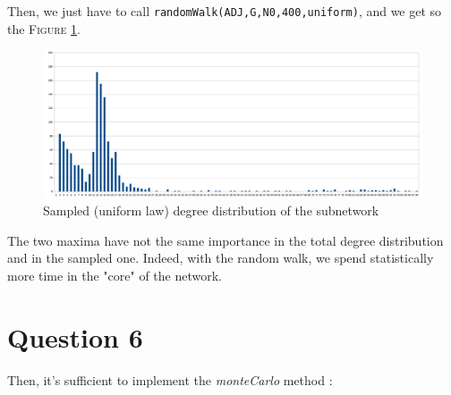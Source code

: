 \documentclass[a4paper]{report}
\begin{document}
Then, we just have to call \texttt{randomWalk(ADJ,G,N0,400,uniform)}, and we get so the \textsc{Figure} \ref{fig:uniform}.

\begin{figure}[!h]
        \includegraphics[scale=.17]{./uniform.png}
        \caption{Sampled (uniform law) degree distribution of the subnetwork}
        \label{fig:uniform}
\end{figure}

The two maxima have not the same importance in the total degree distribution and in the sampled one. Indeed, with the random walk, we spend statistically more time in the "core" of the network.

\section*{Question 6}
Then, it's sufficient to implement the \textit{monteCarlo} method : \\
\end{document}
